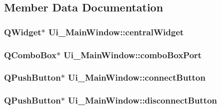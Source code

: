 \subsection{Member Data Documentation}
\hypertarget{class_ui___main_window_a30075506c2116c3ed4ff25e07ae75f81}{
\subsubsection[{central\-Widget}]{\setlength{\rightskip}{0pt plus 5cm}Q\-Widget$\ast$ Ui\-\_\-\-Main\-Window\-::central\-Widget}}\label{class_ui___main_window_a30075506c2116c3ed4ff25e07ae75f81}
\hypertarget{class_ui___main_window_a9bff57744bbf4e66df1a44b618cb4e36}{
\subsubsection[{combo\-Box\-Port}]{\setlength{\rightskip}{0pt plus 5cm}Q\-Combo\-Box$\ast$ Ui\-\_\-\-Main\-Window\-::combo\-Box\-Port}}\label{class_ui___main_window_a9bff57744bbf4e66df1a44b618cb4e36}
\hypertarget{class_ui___main_window_a2be0aeea6aafd9452b68be78669c2703}{
\subsubsection[{connect\-Button}]{\setlength{\rightskip}{0pt plus 5cm}Q\-Push\-Button$\ast$ Ui\-\_\-\-Main\-Window\-::connect\-Button}}\label{class_ui___main_window_a2be0aeea6aafd9452b68be78669c2703}
\hypertarget{class_ui___main_window_af9bea8f9fa6502089441800bf095a7be}{
\subsubsection[{disconnect\-Button}]{\setlength{\rightskip}{0pt plus 5cm}Q\-Push\-Button$\ast$ Ui\-\_\-\-Main\-Window\-::disconnect\-Button}}\label{class_ui___main_window_af9bea8f9fa6502089441800bf095a7be}
